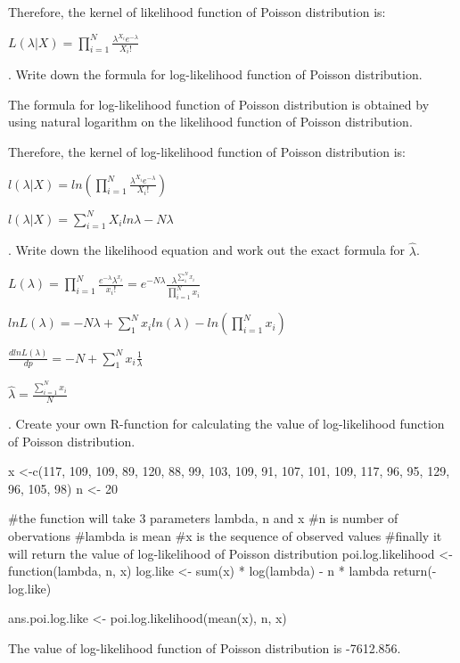 \documentclass[12pt, oneside]{report}\usepackage[]{graphicx}\usepackage[]{color}
\begin{document}
Therefore, the kernel of likelihood function of Poisson distribution is: \newline

$L(\lambda|X) = \displaystyle\prod_{i=1}^{N} \frac{\lambda^{X_i} e^{-\lambda}}{X_i !}$ \newline


. Write down the formula for log-likelihood function of Poisson distribution. \newline

The formula for log-likelihood function of Poisson distribution is obtained by using natural logarithm on the likelihood function of Poisson distribution. \newline

Therefore, the kernel of log-likelihood function of Poisson distribution is: \newline

$l(\lambda|X) = ln \left( \displaystyle\prod_{i=1}^{N} \frac{\lambda^{X_i} e^{-\lambda}}{X_i !} \right)$ \newline

$l(\lambda|X) = \displaystyle\sum_{i=1}^{N} X_i ln \lambda - N \lambda$ \newline

. Write down the likelihood equation and work out the exact formula for $\hat{\lambda}$. \newline

$L(\lambda) =  \displaystyle\prod_{i=1}^{N} \frac{e^{-\lambda}\lambda^{x_i}}{x_i !} = e^{-N\lambda} \frac{\lambda^{\sum_{1}^{N}x_i}}{\prod_{i=1}^{N} x_i}$ \newline

$ln L(\lambda) = -N\lambda + \displaystyle\sum_{1}^{N}x_iln(\lambda) - ln\left(\displaystyle\prod_{i=1}^{N} x_i\right)$ \newline

$\frac{dlnL(\lambda)}{dp} = -N + \displaystyle\sum_{1}^{N} x_i \frac{1}{\lambda}$ \newline

$\hat{\lambda} = \frac{\sum_{i=1}^{N}x_i}{N}$ \newline

. Create your own R-function for calculating the value of log-likelihood function of Poisson distribution.
\begin{Schunk}
\begin{Sinput}
x <-c(117, 109, 109, 89, 120, 88, 99, 103, 109, 91, 107, 101, 109, 117, 96, 95, 129, 96, 105, 98)
n <- 20

#the function will take 3 parameters lambda, n and x
#n is number of obervations
#lambda is mean
#x is the sequence of observed values
#finally it will return the value of log-likelihood of Poisson distribution
poi.log.likelihood <- function(lambda, n, x){
  log.like <- sum(x) * log(lambda) - n * lambda
  return(-log.like)
}

ans.poi.log.like <- poi.log.likelihood(mean(x), n, x)
\end{Sinput}
\end{Schunk}
The value of log-likelihood function of Poisson distribution is -7612.856. \newline
\end{document}
